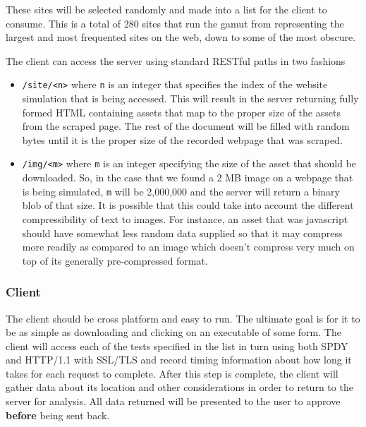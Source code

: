 \documentclass[11pt,letterpaper,notitlepage]{article}
\begin{document}
These sites will be selected randomly and made into a list for the client to
consume. This is a total of 280 sites that run the gamut from representing the
largest and most frequented sites on the web, down to some of the most obscure.

The client can access the server using standard RESTful paths in two fashions
\begin{itemize}
\item \texttt{/site/<n>} where \texttt{n} is an integer that specifies the index
of the website simulation that is being accessed.  This will result in the
server returning fully formed HTML containing assets that map to the proper size
of the assets from the scraped page.  The rest of the document will be filled
with random bytes until it is the proper size of the recorded webpage that was
scraped.
\item \texttt{/img/<m>} where \texttt{m} is an integer specifying the size of the
asset that should be downloaded. So, in the case that we found a 2 MB image on a
webpage that is being simulated, \texttt{m} will be 2,000,000 and the server
will return a binary blob of that size. It is possible that this could take into
account the different compressibility of text to images.  For instance, an asset
that was javascript should have somewhat less random data supplied so that it
may compress more readily as compared to an image which doesn't compress very
much on top of its generally pre-compressed format.
\end{itemize}

\subsubsection{Client}
\label{sec:research/client}
The client should be cross platform and easy to run.  The ultimate goal is for
it to be as simple as downloading and clicking on an executable of some form.
The client will access each of the tests specified in the list in turn using
both SPDY and HTTP/1.1 with SSL/TLS and
record timing information about how long it takes for each request to complete.
After this step is complete, the client will gather data about its location and
other considerations in order to return to the server for analysis.  All data
returned will be presented to the user to approve \textbf{before} being sent
back.

\end{document}
